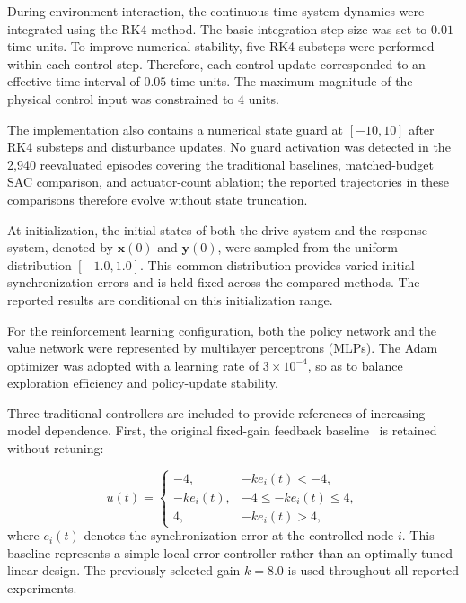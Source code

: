 \documentclass[a4paper,fleqn]{cas-dc}
\theoremstyle{plain}
\theoremstyle{definition}
\begin{document}
During environment interaction, the continuous-time system dynamics were integrated using the RK4 method. The basic integration step size was set to $0.01$ time units. To improve numerical stability, five RK4 substeps were performed within each control step. Therefore, each control update corresponded to an effective time interval of $0.05$ time units. The maximum magnitude of the physical control input was constrained to 4 units.

The implementation also contains a numerical state guard at $[-10,10]$ after RK4 substeps and disturbance updates. No guard activation was detected in the 2,940 reevaluated episodes covering the traditional baselines, matched-budget SAC comparison, and actuator-count ablation; the reported trajectories in these comparisons therefore evolve without state truncation.

At initialization, the initial states of both the drive system and the response system, denoted by $\mathbf{x}(0)$ and $\mathbf{y}(0)$, were sampled from the uniform distribution $[-1.0,1.0]$. This common distribution provides varied initial synchronization errors and is held fixed across the compared methods. The reported results are conditional on this initialization range.

For the reinforcement learning configuration, both the policy network and the value network were represented by multilayer perceptrons (MLPs). The Adam optimizer was adopted with a learning rate of $3\times 10^{-4}$, so as to balance exploration efficiency and policy-update stability.

Three traditional controllers are included to provide references of increasing model dependence. First, the original fixed-gain feedback baseline~\cite{yassen2005controlling} is retained without retuning:

\begin{equation}
	u(t)=
	\begin{cases}
		-4, & -k e_i(t)<-4,\\
		-k e_i(t), & -4\leq -k e_i(t)\leq 4,\\
		4, & -k e_i(t)>4,
	\end{cases}
	\label{eq:linear_feedback_baseline}
\end{equation}
where $e_i(t)$ denotes the synchronization error at the controlled node $i$. This baseline represents a simple local-error controller rather than an optimally tuned linear design. The previously selected gain $k=8.0$ is used throughout all reported experiments.
\end{document}

